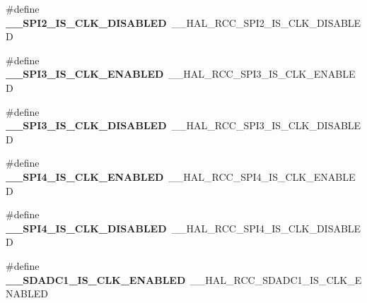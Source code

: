 \begin{DoxyCompactItemize}
\item 
\hypertarget{group___h_a_l___r_c_c___aliased_gab99f19a7d6156eee3e682ac8790dba69}{\#define {\bfseries \-\_\-\-\_\-\-S\-P\-I2\-\_\-\-I\-S\-\_\-\-C\-L\-K\-\_\-\-D\-I\-S\-A\-B\-L\-E\-D}~\-\_\-\-\_\-\-H\-A\-L\-\_\-\-R\-C\-C\-\_\-\-S\-P\-I2\-\_\-\-I\-S\-\_\-\-C\-L\-K\-\_\-\-D\-I\-S\-A\-B\-L\-E\-D}\label{group___h_a_l___r_c_c___aliased_gab99f19a7d6156eee3e682ac8790dba69}

\item 
\hypertarget{group___h_a_l___r_c_c___aliased_gafc41a76183e7eeb5488ca82849b6c283}{\#define {\bfseries \-\_\-\-\_\-\-S\-P\-I3\-\_\-\-I\-S\-\_\-\-C\-L\-K\-\_\-\-E\-N\-A\-B\-L\-E\-D}~\-\_\-\-\_\-\-H\-A\-L\-\_\-\-R\-C\-C\-\_\-\-S\-P\-I3\-\_\-\-I\-S\-\_\-\-C\-L\-K\-\_\-\-E\-N\-A\-B\-L\-E\-D}\label{group___h_a_l___r_c_c___aliased_gafc41a76183e7eeb5488ca82849b6c283}

\item 
\hypertarget{group___h_a_l___r_c_c___aliased_ga36bcdd622174a4d7bea218d00c17f16f}{\#define {\bfseries \-\_\-\-\_\-\-S\-P\-I3\-\_\-\-I\-S\-\_\-\-C\-L\-K\-\_\-\-D\-I\-S\-A\-B\-L\-E\-D}~\-\_\-\-\_\-\-H\-A\-L\-\_\-\-R\-C\-C\-\_\-\-S\-P\-I3\-\_\-\-I\-S\-\_\-\-C\-L\-K\-\_\-\-D\-I\-S\-A\-B\-L\-E\-D}\label{group___h_a_l___r_c_c___aliased_ga36bcdd622174a4d7bea218d00c17f16f}

\item 
\hypertarget{group___h_a_l___r_c_c___aliased_ga30d37b49b9b44a979d02cd7ebfad048b}{\#define {\bfseries \-\_\-\-\_\-\-S\-P\-I4\-\_\-\-I\-S\-\_\-\-C\-L\-K\-\_\-\-E\-N\-A\-B\-L\-E\-D}~\-\_\-\-\_\-\-H\-A\-L\-\_\-\-R\-C\-C\-\_\-\-S\-P\-I4\-\_\-\-I\-S\-\_\-\-C\-L\-K\-\_\-\-E\-N\-A\-B\-L\-E\-D}\label{group___h_a_l___r_c_c___aliased_ga30d37b49b9b44a979d02cd7ebfad048b}

\item 
\hypertarget{group___h_a_l___r_c_c___aliased_gaaf50175966a77411fd792be594bb0c55}{\#define {\bfseries \-\_\-\-\_\-\-S\-P\-I4\-\_\-\-I\-S\-\_\-\-C\-L\-K\-\_\-\-D\-I\-S\-A\-B\-L\-E\-D}~\-\_\-\-\_\-\-H\-A\-L\-\_\-\-R\-C\-C\-\_\-\-S\-P\-I4\-\_\-\-I\-S\-\_\-\-C\-L\-K\-\_\-\-D\-I\-S\-A\-B\-L\-E\-D}\label{group___h_a_l___r_c_c___aliased_gaaf50175966a77411fd792be594bb0c55}

\item 
\hypertarget{group___h_a_l___r_c_c___aliased_gaa7042e6be9f2529f230c8cd07d23be8b}{\#define {\bfseries \-\_\-\-\_\-\-S\-D\-A\-D\-C1\-\_\-\-I\-S\-\_\-\-C\-L\-K\-\_\-\-E\-N\-A\-B\-L\-E\-D}~\-\_\-\-\_\-\-H\-A\-L\-\_\-\-R\-C\-C\-\_\-\-S\-D\-A\-D\-C1\-\_\-\-I\-S\-\_\-\-C\-L\-K\-\_\-\-E\-N\-A\-B\-L\-E\-D}\label{group___h_a_l___r_c_c___aliased_gaa7042e6be9f2529f230c8cd07d23be8b}


\end{DoxyCompactItemize}
